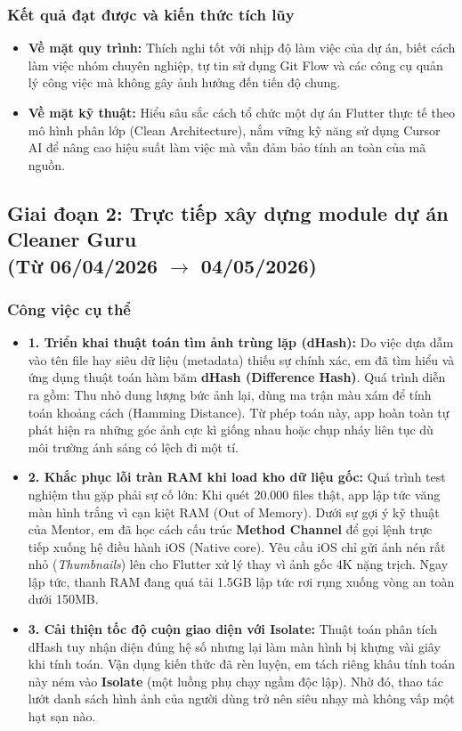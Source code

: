 \documentclass[12pt, a4paper]{article}
\begin{document}
\subsubsection{Kết quả đạt được và kiến thức tích lũy}
\begin{itemize}
    \item \textbf{Về mặt quy trình:} Thích nghi tốt với nhịp độ làm việc của dự án, biết cách làm việc nhóm chuyên nghiệp, tự tin sử dụng Git Flow và các công cụ quản lý công việc mà không gây ảnh hưởng đến tiến độ chung.
    \item \textbf{Về mặt kỹ thuật:} Hiểu sâu sắc cách tổ chức một dự án Flutter thực tế theo mô hình phân lớp (Clean Architecture), nắm vững kỹ năng sử dụng Cursor AI để nâng cao hiệu suất làm việc mà vẫn đảm bảo tính an toàn của mã nguồn.
\end{itemize}

\subsection[Giai đoạn 2: Trực tiếp xây dựng module dự án Cleaner Guru (Từ 06/04/2026 đến 04/05/2026)]{Giai đoạn 2: Trực tiếp xây dựng module dự án Cleaner Guru \\(Từ 06/04/2026 $\rightarrow$ 04/05/2026)}
\subsubsection{Công việc cụ thể}
\begin{itemize}
    \item \textbf{1. Triển khai thuật toán tìm ảnh trùng lặp (dHash):} 
    Do việc dựa dẫm vào tên file hay siêu dữ liệu (metadata) thiếu sự chính xác, em đã tìm hiểu và ứng dụng thuật toán hàm băm \textbf{dHash (Difference Hash)}. Quá trình diễn ra gồm: Thu nhỏ dung lượng bức ảnh lại, dùng ma trận màu xám để tính toán khoảng cách (Hamming Distance). Từ phép toán này, app hoàn toàn tự phát hiện ra những góc ảnh cực kì giống nhau hoặc chụp nháy liên tục dù môi trường ánh sáng có lệch đi một tí.
    
    \item \textbf{2. Khắc phục lỗi tràn RAM khi load kho dữ liệu gốc:} 
    Quá trình test nghiệm thu gặp phải sự cố lớn: Khi quét 20.000 files thật, app lập tức văng màn hình trắng vì cạn kiệt RAM (Out of Memory). Dưới sự gợi ý kỹ thuật của Mentor, em đã học cách cấu trúc \textbf{Method Channel} để gọi lệnh trực tiếp xuống hệ điều hành iOS (Native core). Yêu cầu iOS chỉ gửi ảnh nén rất nhỏ (\textit{Thumbnails}) lên cho Flutter xử lý thay vì ảnh gốc 4K nặng trịch. Ngay lập tức, thanh RAM đang quá tải 1.5GB lập tức rơi rụng xuống vòng an toàn dưới 150MB.

    \item \textbf{3. Cải thiện tốc độ cuộn giao diện với Isolate:}
    Thuật toán phân tích dHash tuy nhận diện đúng hệ số nhưng lại làm màn hình bị khựng vài giây khi tính toán. Vận dụng kiến thức đã rèn luyện, em tách riêng khâu tính toán này ném vào \textbf{Isolate} (một luồng phụ chạy ngầm độc lập). Nhờ đó, thao tác lướt danh sách hình ảnh của người dùng trở nên siêu nhạy mà không vấp một hạt sạn nào.
\end{itemize}
\end{document}

